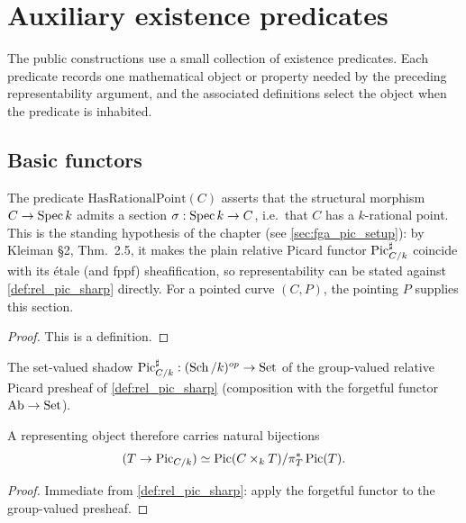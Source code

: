 \section{Auxiliary existence predicates}
\label{sec:fga_pic_typeclass_scaffolding}

The public constructions use a small collection of existence predicates. Each
predicate records one mathematical object or property needed by the preceding
representability argument, and the associated definitions select the object
when the predicate is inhabited.

\subsection{Basic functors}
\label{subsec:fga_pic_functor_carriers}

\begin{definition}\leanok
  \label{def:has_rational_point}
  The predicate \(\mathrm{HasRationalPoint}(C)\) asserts that the structural
  morphism \(C \to \operatorname{Spec} k\) admits a section
  \(\sigma : \operatorname{Spec} k \to C\), i.e.\ that \(C\) has a \(k\)-rational point.
  This is the standing hypothesis of the chapter (see
  \cref{sec:fga_pic_setup}): by Kleiman \S 2, Thm.~2.5, it makes the plain
  relative Picard functor \(\operatorname{Pic}^\sharp_{C/k}\) coincide with its \'etale
  (and fppf) sheafification, so representability can be stated against
  \cref{def:rel_pic_sharp} directly. For a pointed curve \((C,P)\), the
  pointing \(P\) supplies this section.
\end{definition}

\begin{proof}\leanok
  This is a definition.
\end{proof}

\begin{definition}\leanok
  \label{def:pic_sharp_carrier}
  The set-valued shadow \(\operatorname{Pic}^\sharp_{C/k} : (\operatorname{Sch}/k)^{op} \to \mathrm{Set}\) of the
  group-valued relative Picard presheaf of \cref{def:rel_pic_sharp}
  (composition with the forgetful functor \(\mathrm{Ab} \to \mathrm{Set}\)).

  A representing object therefore carries natural bijections
  \[
    (T \to \operatorname{Pic}_{C/k}) \simeq
    \operatorname{Pic}(C \times_k T)/\pi_T^*\operatorname{Pic}(T).
  \]
\end{definition}

\begin{proof}\leanok
  Immediate from \cref{def:rel_pic_sharp}: apply the forgetful functor to
  the group-valued presheaf.
\end{proof}

